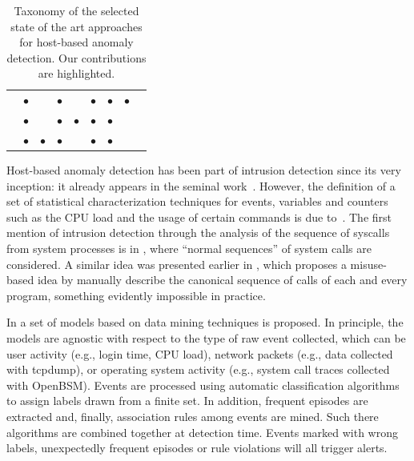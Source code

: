 \begin{table}
\begin{tabular}{rcccccccc}
    \textbf{\citep{zanero_self}} &
    $\bullet$ & & $\bullet$ & & $\bullet$ & $\bullet$ & $\bullet$ \\

    \textbf{\citep{10.1109/TDSC.2008.69}} & $\bullet$ & & $\bullet$ &
    $\bullet$ & $\bullet$ & $\bullet$ & \\

    \textbf{\citep{2009_frossi_maggi_rizzo_zanero_improving_syscall_models}}
    & $\bullet$ & $\bullet$ &
    $\bullet$ & & $\bullet$ & $\bullet$ & \\

    \bottomrule
  \end{tabular}
  \caption{Taxonomy of the selected state of the art approaches for
    host-based anomaly detection. Our contributions are highlighted.}
  \label{tab:host-sota-taxonomy}
\end{table}

Host-based anomaly detection has been part of intrusion detection
since its very inception: it already appears in the seminal
work~\citep{anderson}. However, the definition of a set of statistical
characterization techniques for events, variables and counters such as
the \ac{CPU} load and the usage of certain commands is due
to~\citep{denning:tse1987:ides}. The first mention of intrusion
detection through the analysis of the sequence of syscalls from system
processes is in \citep{Self}, where ``normal sequences'' of system
calls are considered. A similar idea was presented earlier in
\citep{PrivilegedProgramsMonitoring}, which proposes a misuse-based
idea by manually describe the canonical sequence of calls of each and
every program, something evidently impossible in practice.

In \citep{lee:2000:framework} a set of models based on data mining
techniques is proposed. In principle, the models are agnostic with
respect to the type of raw event collected, which can be user activity
(e.g., login time, \ac{CPU} load), network packets (e.g.,
data collected with \textsf{tcpdump}), or operating
system activity (e.g., system call traces collected with
\textsf{OpenBSM}). Events are processed using automatic classification
algorithms to assign labels drawn from a finite set. In addition,
frequent episodes are extracted and, finally, association rules among
events are mined. Such there algorithms are combined together at
detection time. Events marked with wrong labels, unexpectedly frequent
episodes or rule violations will all trigger alerts.

